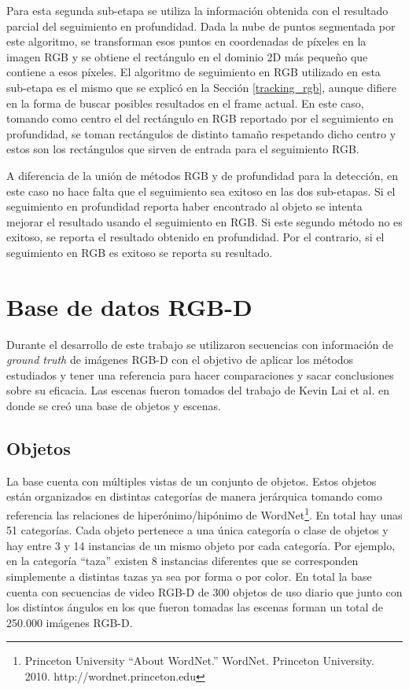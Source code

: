 Para esta segunda sub-etapa se utiliza la información obtenida con el resultado parcial del seguimiento en profundidad. Dada la nube de puntos segmentada por este algoritmo, se transforman esos puntos en coordenadas de píxeles en la imagen RGB y se obtiene el rectángulo en el dominio 2D más pequeño que contiene a esos píxeles. El algoritmo de seguimiento en RGB utilizado en esta sub-etapa es el mismo que se explicó en la Sección \ref{tracking_rgb}, aunque difiere en la forma de buscar posibles resultados en el frame actual. En este caso, tomando como centro el del rectángulo en RGB reportado por el seguimiento en profundidad, se toman rectángulos de distinto tamaño respetando dicho centro y estos son los rectángulos que sirven de entrada para el seguimiento RGB.

A diferencia de la unión de métodos RGB y de profundidad para la detección, en este caso no hace falta que el seguimiento sea exitoso en las dos sub-etapas. Si el seguimiento en profundidad reporta haber encontrado al objeto se intenta mejorar el resultado usando el seguimiento en RGB. Si este segundo método no es exitoso, se reporta el resultado obtenido en profundidad. Por el contrario, si el seguimiento en RGB es exitoso se reporta su resultado.


\chapter{Base de datos RGB-D}\label{base_rgbd}
Durante el desarrollo de este trabajo se utilizaron secuencias con información de \textit{ground truth} de imágenes RGB-D con el objetivo de aplicar los métodos estudiados y tener una referencia para hacer comparaciones y sacar conclusiones sobre su eficacia. Las escenas fueron tomados del trabajo de Kevin Lai et al. \cite{lai2011large} en donde se creó una base de objetos y escenas.

\section{Objetos}
La base cuenta con múltiples vistas de un conjunto de objetos. Estos objetos están organizados en distintas categorías de manera jerárquica tomando como referencia las relaciones de hiperónimo/hipónimo de WordNet\footnote{Princeton University ``About WordNet.'' WordNet. Princeton University. 2010. http://wordnet.princeton.edu}. En total hay unas 51 categorías. Cada objeto pertenece a una única categoría o clase de objetos y hay entre 3 y 14 instancias de un mismo objeto por cada categoría. Por ejemplo, en la categoría ``taza'' existen 8 instancias diferentes que se corresponden simplemente a distintas tazas ya sea por forma o por color. En total la base cuenta con secuencias de video RGB-D de 300 objetos de uso diario que junto con los distintos ángulos en los que fueron tomadas las escenas forman un total de 250.000 imágenes RGB-D.


